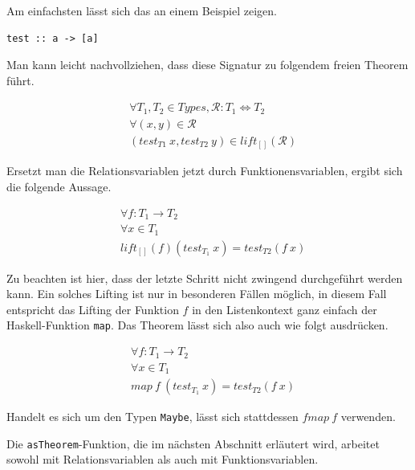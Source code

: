 Am einfachsten lässt sich das an einem Beispiel zeigen.

\begin{verbatim}
test :: a -> [a]
\end{verbatim}

Man kann leicht nachvollziehen, dass diese Signatur zu folgendem freien Theorem führt.

\begin{align*}
& \forall T_1, T_2 \in Types, \mathcal{R} : T_1 \Leftrightarrow T_2 \\
& \forall (x, y) \in \mathcal{R} \\
& (test_{T1}\ x, test_{T2}\ y) \in lift_{[]}(\mathcal{R})
\end{align*}

Ersetzt man die Relationsvariablen jetzt durch Funktionensvariablen, ergibt sich die folgende Aussage.

\begin{align*}
& \forall f : T_1 \rightarrow T_2 \\
& \forall x \in T_1 \\
& lift_{[]}(f) (test_{T_1}\ x) = test_{T2} (f\ x)
\end{align*}

Zu beachten ist hier, dass der letzte Schritt nicht zwingend durchgeführt werden kann. Ein solches Lifting ist nur in besonderen
Fällen möglich, in diesem Fall entspricht das Lifting der Funktion $f$ in den Listenkontext ganz einfach der Haskell-Funktion
\texttt{map}. Das Theorem lässt sich also auch wie folgt ausdrücken.

\begin{align*}
& \forall f : T_1 \rightarrow T_2 \\
& \forall x \in T_1 \\
& map\ f\ (test_{T_1}\ x) = test_{T2} (f\ x)
\end{align*}

Handelt es sich um den Typen \texttt{Maybe}, lässt sich stattdessen $fmap\ f$ verwenden.

Die \texttt{asTheorem}-Funktion, die im nächsten Abschnitt erläutert wird, arbeitet sowohl mit Relationsvariablen als auch mit
Funktionsvariablen.



